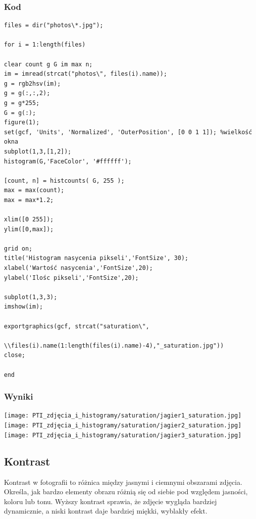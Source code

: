 \documentclass[options]{mwart}
\begin{document}
\subsubsection{Kod}
\begin{verbatim}
files = dir("photos\*.jpg");

for i = 1:length(files)

clear count g G im max n;
im = imread(strcat("photos\", files(i).name));
g = rgb2hsv(im);
g = g(:,:,2);
g = g*255;
G = g(:);
figure(1);
set(gcf, 'Units', 'Normalized', 'OuterPosition', [0 0 1 1]); %wielkość okna
subplot(1,3,[1,2]); 
histogram(G,'FaceColor', '#ffffff');

[count, n] = histcounts( G, 255 );
max = max(count);
max = max*1.2;

xlim([0 255]);
ylim([0,max]);

grid on;
title('Histogram nasycenia pikseli','FontSize', 30);
xlabel('Wartość nasycenia','FontSize',20);
ylabel('Ilośc pikseli','FontSize',20);

subplot(1,3,3);
imshow(im);

exportgraphics(gcf, strcat("saturation\", 
            \\files(i).name(1:length(files(i).name)-4),"_saturation.jpg"))
close;

end

\end{verbatim}

\newpage
\subsubsection{Wyniki}

\texttt{[image: PTI\_zdjęcia\_i\_histogramy/saturation/jagier1\_saturation.jpg]}
\texttt{[image: PTI\_zdjęcia\_i\_histogramy/saturation/jagier2\_saturation.jpg]}
\texttt{[image: PTI\_zdjęcia\_i\_histogramy/saturation/jagier3\_saturation.jpg]}

\newpage



\newpage
\subsection{Kontrast}
Kontrast w fotografii to różnica między jasnymi i ciemnymi obszarami zdjęcia.
Określa, jak bardzo elementy obrazu różnią się od siebie pod względem
jasności, koloru lub tonu. Wyższy kontrast sprawia, że zdjęcie wygląda
bardziej dynamicznie, a niski kontrast daje bardziej miękki, wyblakły
efekt.
\end{document}
